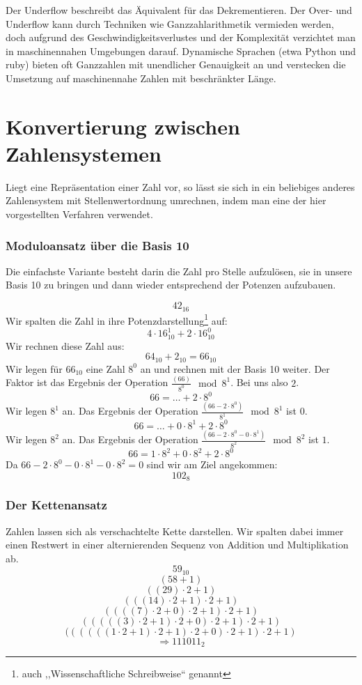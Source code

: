 Der Underflow beschreibt das Äquivalent für das Dekrementieren.
Der Over- und Underflow kann durch Techniken wie Ganzzahlarithmetik vermieden
werden, doch aufgrund des Geschwindigkeitsverlustes und der Komplexität
verzichtet man in maschinennahen Umgebungen darauf. Dynamische Sprachen
(etwa Python und ruby) bieten oft Ganzzahlen mit unendlicher Genauigkeit
an und verstecken die Umsetzung auf maschinennahe Zahlen mit beschränkter
Länge.
%
\section{Konvertierung zwischen Zahlensystemen}
%
Liegt eine Repräsentation einer Zahl vor, so lässt sie sich in ein beliebiges
anderes Zahlensystem mit Stellenwertordnung umrechnen, indem man eine der
hier vorgestellten Verfahren verwendet.
%
\subsubsection{Moduloansatz über die Basis 10}
%
Die einfachste Variante besteht darin die Zahl pro Stelle aufzulösen,
sie in unsere Basis 10 zu bringen und dann wieder entsprechend der Potenzen
aufzubauen.

\[ 42_{16} \]
%
Wir spalten die Zahl in ihre Potenzdarstellung\footnote{%
auch ,,Wissenschaftliche Schreibweise`` genannt} auf:
\[ 4\cdot 16_{10}^1 + 2\cdot 16_{10}^0 \]
%
Wir rechnen diese Zahl aus:
\[ 64_{10} + 2_{10} = 66_{10} \]
%
Wir legen für $66_{10}$ eine Zahl $8^0$ an und rechnen mit der Basis 10 weiter.
Der Faktor ist das Ergebnis der Operation $\frac{(66)}{8^0}\mod{8^1}$.
Bei uns also $2$.
\[ 66 = \ldots + 2\cdot 8^0 \]
%
Wir legen $8^1$ an. Das Ergebnis der Operation
$\frac{(66-2\cdot8^0)}{8^1}\mod{8^1}$ ist $0$.
\[ 66 = \ldots + 0\cdot 8^1 + 2\cdot 8^0 \]
%
Wir legen $8^2$ an. Das Ergebnis der Operation
$\frac{(66-2\cdot8^0-0\cdot8^1)}{8^2}\mod{8^2}$ ist $1$.
\[ 66 = 1\cdot8^2 + 0\cdot8^2 + 2\cdot8^0 \]
%
Da $66-2\cdot8^0-0\cdot8^1-0\cdot8^2 = 0$ sind wir am Ziel angekommen:
\[ 102_{8} \]

\subsubsection{Der Kettenansatz}
%
Zahlen lassen sich als verschachtelte Kette darstellen.
Wir spalten dabei immer einen Restwert in einer alternierenden
Sequenz von Addition und Multiplikation ab.
%
\[
  59_{10}
\] \[
  (58 + 1)
\] \[
  ((29)\cdot2 + 1)
\] \[
  (((14)\cdot2 + 1)\cdot2 + 1)
\] \[
  ((((7)\cdot2 + 0)\cdot2 + 1)\cdot2 + 1)
\] \[
  (((((3)\cdot2 + 1)\cdot2 + 0)\cdot2 + 1)\cdot2 + 1)
\] \[
  ((((((1\cdot2 + 1)\cdot2 + 1)\cdot2 + 0)\cdot2 + 1)\cdot2 + 1)
\] \[
  \Rightarrow 111011_2
\]

